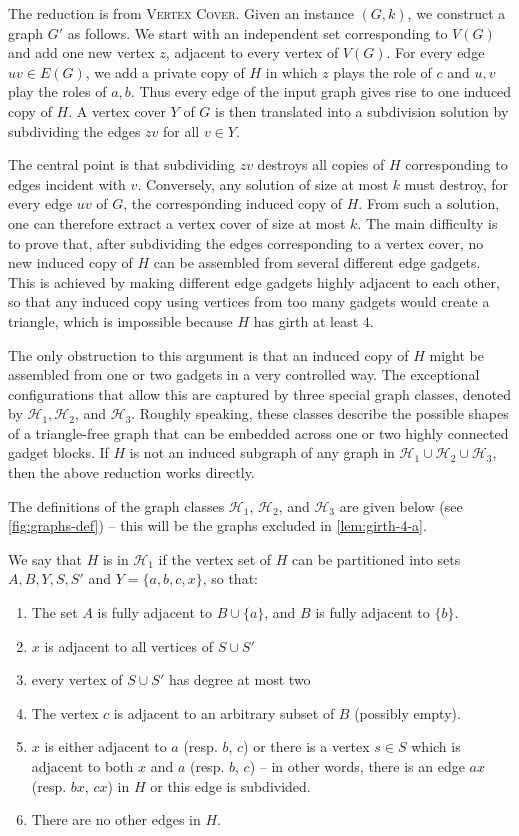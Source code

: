 \documentclass[a4paper,UKenglish,cleveref, autoref, thm-restate]{lipics-v2021}
\newcommand{\cH}{\mathcal{H}}
\begin{document}
The reduction is from \textsc{Vertex Cover}.
Given an instance $(G,k)$, we construct a graph $G'$ as follows.
We start with an independent set corresponding to $V(G)$ and add one new vertex $z$, adjacent to every vertex of $V(G)$.
For every edge $uv\in E(G)$, we add a private copy of $H$ in which $z$ plays the role of $c$ and $u,v$ play the roles of $a,b$.
Thus every edge of the input graph gives rise to one induced copy of $H$.
A vertex cover $Y$ of $G$ is then translated into a subdivision solution by subdividing the edges $zv$ for all $v\in Y$.

The central point is that subdividing $zv$ destroys all copies of $H$ corresponding to edges incident with $v$.
Conversely, any solution of size at most $k$ must destroy, for every edge $uv$ of $G$, the corresponding induced copy of $H$.
From such a solution, one can therefore extract a vertex cover of size at most $k$.
The main difficulty is to prove that, after subdividing the edges corresponding to a vertex cover, no new induced copy of $H$ can be assembled from several different edge gadgets.
This is achieved by making different edge gadgets highly adjacent to each other, so that any induced copy using vertices from too many gadgets would create a triangle, which is impossible because $H$ has girth at least $4$.

The only obstruction to this argument is that an induced copy of $H$ might be assembled from one or two gadgets in a very controlled way.
The exceptional configurations that allow this are captured by three special graph classes, denoted by
$\mathcal H_1,\mathcal H_2$, and $\mathcal H_3$.
Roughly speaking, these classes describe the possible shapes of a triangle-free graph that can be embedded across one or two highly connected gadget blocks.
If $H$ is not an induced subgraph of any graph in
$\mathcal H_1\cup\mathcal H_2\cup\mathcal H_3$, then the above reduction works directly.

The definitions of the graph classes $\cH_1$, $\cH_2$, and $\cH_3$ are given below (see \cref{fig:graphs-def}) -- this will be the graphs excluded in \cref{lem:girth-4-a}.

We say that $H$ is in $\cH_1$ if the vertex set of $H$ can be partitioned into sets $A,B,Y,S,S'$ and $Y=\{a,b,c,x\}$, so that:
\begin{enumerate}[(1)]
    \item The set $A$ is fully adjacent to $B\cup \{a\}$, and $B$ is fully adjacent to $\{b\}$.
    \item $x$ is adjacent to all vertices of $S\cup S'$
    \item every vertex of $S\cup S'$ has degree at most two
\item The vertex $c$ is adjacent to an arbitrary subset of $B$ (possibly empty).
    \item $x$ is either adjacent to $a$ (resp. $b$, $c$) or there is a vertex $s\in S$ which is adjacent to both $x$ and $a$ (resp. $b$, $c$) -- in other words, there is an edge $ax$ (resp. $bx$, $cx$) in $H$ or this edge is subdivided.
    \item There are no other edges in $H$.
\end{enumerate}
\end{document}
